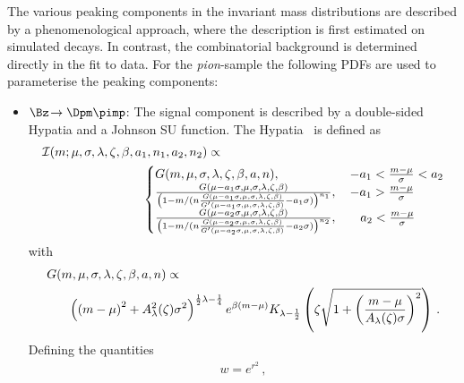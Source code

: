 The various peaking components in the invariant mass distributions are described by a phenomenological approach, where the description is first
estimated on simulated decays.
In contrast, the combinatorial background is determined directly in the fit to data.
For the \emph{pion}-sample the following PDFs are used to parameterise the peaking components:
\begin{itemize}
	\item $\Bz\!\to\Dpm\pimp$: The signal component is described by a double-sided Hypatia and a Johnson SU function.
	The Hypatia~\cite{Santos:2013ky} is defined as
	\begin{equation}
	\begin{aligned}
	&\mathcal{I}(m;\mu,\sigma,\lambda,\zeta,\beta,a_1,n_1,a_2,n_2) \propto\\
	&\hspace{2.8cm}\begin{cases}
	G(m,\mu,\sigma,\lambda,\zeta,\beta,a,n), &\,   - a_1 < \frac{m - \mu}{\sigma} < a_2 \\
	\frac{G(\mu - a_1 \sigma,\mu,\sigma,\lambda,\zeta,\beta)}{\left(1 - m/(n \frac{G(\mu - a_1\sigma,\mu,\sigma,\lambda,\zeta,\beta)}{G^\prime(\mu - a_1 \sigma,\mu,\sigma,\lambda,\zeta,\beta)} -a_1 \sigma)\right)^{n_1}},	&\,  - a_1 > \frac{m - \mu}{\sigma} \\
	\frac{G(\mu - a_2 \sigma,\mu,\sigma,\lambda,\zeta,\beta)}{\left(1 - m/(n \frac{G(\mu - a_2\sigma,\mu,\sigma,\lambda,\zeta,\beta)}{G^\prime(\mu - a_2 \sigma,\mu,\sigma,\lambda,\zeta,\beta)} -a_2 \sigma)\right)^{n_2}},	&\quad a_2 < \frac{m - \mu}{\sigma} \\
	\end{cases}
	\label{eq:ipatia}
	\end{aligned}
	\end{equation}
	with
	\begin{equation}
	\begin{aligned}
	&G(m,\mu,\sigma,\lambda,\zeta,\beta,a,n)\propto\\
	&\hspace{0.6cm}\left(\left(m-\mu\right)^2+A_\lambda^2(\zeta)\sigma^2\right)^{\frac{1}{2}\lambda-\frac{1}{4}}e^{\beta\left(m-\mu\right)}K_{\lambda-\frac{1}{2}}\left(\zeta\sqrt{1+\left(\frac{m-\mu}{A_\lambda(\zeta)\sigma}\right)^2}\right)\,.
	\end{aligned}
	\end{equation}
	Defining the quantities
	\begin{align*}
	&w=e^{r^2}\,,&\\

\end{align*}
\end{itemize}
